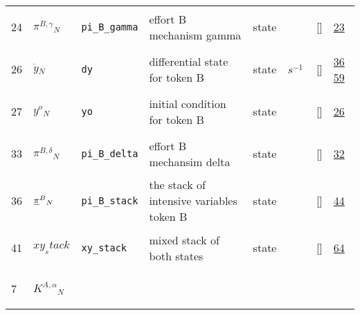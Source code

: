 \begin{longtable}{|p{1cm}|p{3cm}|p{3cm}|p{7cm}|p{3.0cm}|p{3cm}|p{2cm}|p{1cm}|}
                 \\
    24
             & \hypertarget{"v:24"}{ $ {{\pi^{B,\gamma}}}{_{N}} $}
             & \verb|pi_B_gamma|
             & effort B mechanism gamma
             & \begin{lay}state \end{lay}
             & $  $
             & []
             & \hyperlink{"e:23"}{ 23 }
                 \\
    26
             & \hypertarget{"v:26"}{ $ {{\dot{y}}}{_{N}} $}
             & \verb|dy|
             & differential state for token B
             & \begin{lay}state \end{lay}
             & $ s^{-1} \, $
             & []
             & \hyperlink{"e:36"}{ 36 }
                 \hyperlink{"e:59"}{ 59 }
                 \\
    27
             & \hypertarget{"v:27"}{ $ {{y^{o}}}{_{N}} $}
             & \verb|yo|
             & initial condition for token B
             & \begin{lay}state \end{lay}
             & $  $
             & []
             & \hyperlink{"e:26"}{ 26 }
                 \\
    33
             & \hypertarget{"v:33"}{ $ {{\pi^{B,\delta}}}{_{N}} $}
             & \verb|pi_B_delta|
             & effort B mechansim delta
             & \begin{lay}state \end{lay}
             & $  $
             & []
             & \hyperlink{"e:32"}{ 32 }
                 \\
    36
             & \hypertarget{"v:36"}{ $ {{{{\protect\underline{\bf{\pi}}}}^{B}}}{_{N}} $}
             & \verb|pi_B_stack|
             & the stack of intensive variables token B
             & \begin{lay}state \end{lay}
             & $  $
             & []
             & \hyperlink{"e:44"}{ 44 }
                 \\
    41
             & \hypertarget{"v:41"}{ $ {xy_stack}{_{}} $}
             & \verb|xy_stack|
             & mixed stack of both states
             & \begin{lay}state \end{lay}
             & $  $
             & []
             & \hyperlink{"e:64"}{ 64 }
                 \\
    7
             & \hypertarget{"v:7"}{ $ {{K^{A,\alpha}}}{_{N}} $}

\end{longtable}
